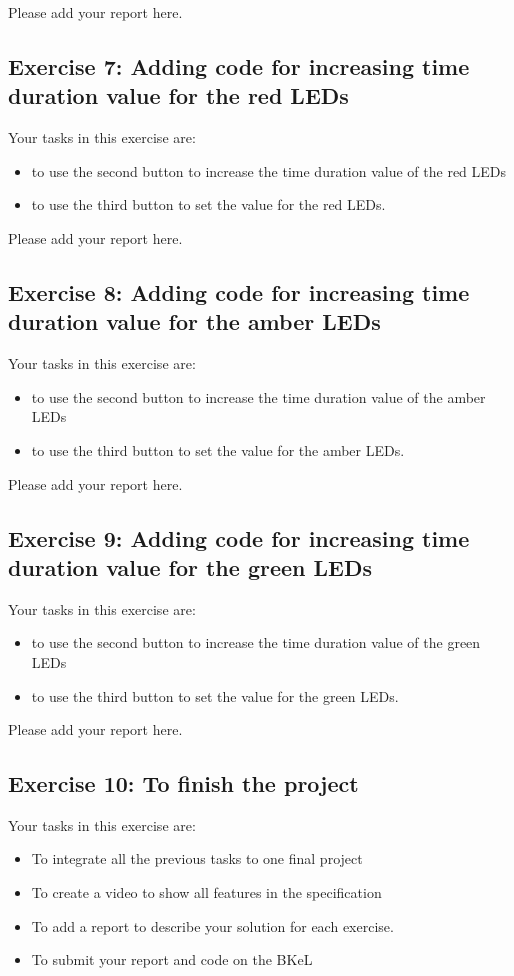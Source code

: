 Please add your report here.
\subsection{Exercise 7: Adding code for increasing time duration value for the red LEDs}
Your tasks in this exercise are: 
\begin{itemize}
    \item to use the second button to increase the time duration value of  the red LEDs
    \item to use the third button to set the value for the red LEDs.
\end{itemize}
Please add your report here.

\subsection{Exercise 8: Adding code for increasing time duration value for the amber LEDs}

Your tasks in this exercise are: 
\begin{itemize}
    \item to use the second button to increase the time duration value of the amber LEDs
    \item to use the third button to set the value for the amber LEDs.
\end{itemize}
Please add your report here.
\subsection{Exercise 9: Adding code for increasing time duration value for the green LEDs}

Your tasks in this exercise are: 
\begin{itemize}
    \item to use the second button to increase the  time duration value of the green LEDs
    \item to use the third button to set the value for the green LEDs.
\end{itemize}
Please add your report here.

\subsection{Exercise 10: To finish the project}
Your tasks in this exercise are:
\begin{itemize}
    \item To integrate all the previous tasks to one final project
    \item To create a video to show all features in the specification
    \item To add a report to describe your solution for each exercise.
    \item To submit your report and code on the BKeL
\end{itemize}

